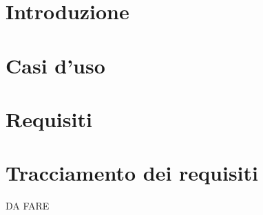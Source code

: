 \documentclass[a4paper, oneside, openany, dvipsnames, table]{article}
\begin{document}
\copertina{} 
\tableofcontents
\newpage

\newpage
\section{Introduzione}

\newpage
\section{Casi d'uso}

\newpage

\newpage

\newpage

\newpage

\section{Requisiti}

\section{Tracciamento dei requisiti}
DA FARE
\end{document}
